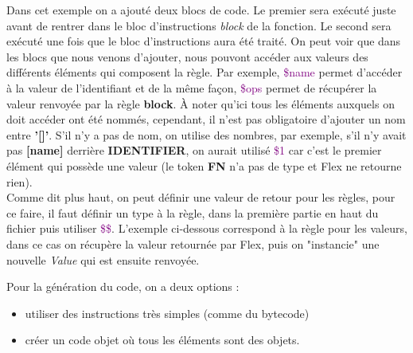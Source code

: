 \documentclass[a4paper]{article}%
\begin{document}
Dans cet exemple on a ajouté deux blocs de code. Le premier sera exécuté juste
avant de rentrer dans le bloc d'instructions \textit{block} de la fonction. Le
second sera exécuté une fois que le bloc d'instructions aura été traité. On
peut voir que dans les blocs que nous venons d'ajouter, nous pouvont accéder
aux valeurs des différents éléments qui composent la règle. Par exemple,
\textcolor{purple}{\$name} permet d'accéder à la valeur de l'identifiant et de
la même façon, \textcolor{purple}{\$ops} permet de récupérer la valeur renvoyée
par la règle \textbf{block}. À noter qu'ici tous les éléments  auxquels on doit
accéder ont été nommés, cependant, il n'est pas obligatoire d'ajouter un nom
entre \textbf{'[]'}. S'il n'y a pas de nom, on utilise des nombres, par exemple,
s'il n'y avait pas \textbf{[name]} derrière \textbf{IDENTIFIER}, on aurait
utilisé \textcolor{purple}{\$1} car c'est le premier élément qui possède une
valeur (le token \textbf{FN} n'a pas de type et Flex ne retourne rien).\\


Comme dit plus haut, on peut définir une valeur de retour pour les règles, pour
ce faire, il faut définir un type à la règle, dans la première partie en haut du
fichier puis utiliser \textcolor{purple}{\$\$}. L'exemple ci-dessous correspond
à la règle pour les valeurs, dans ce cas on récupère la valeur retournée par
Flex, puis on "instancie" une nouvelle \textit{Value} qui est ensuite renvoyée.

\leavevmode\newline

Pour la génération du code, on a deux options :
\begin{itemize}
  \item utiliser des instructions très simples (comme du bytecode)
\item créer un code objet où tous les éléments sont des objets.
\end{itemize}\leavevmode\\~\\
\end{document}
